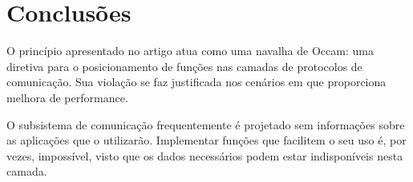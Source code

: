 \section*{Conclusões}

O princípio apresentado no artigo atua como uma navalha de Occam: uma diretiva para o posicionamento de funções nas camadas de protocolos de comunicação. Sua violação se faz justificada nos cenários em que proporciona melhora de performance.

O subsistema de comunicação frequentemente é projetado sem informações sobre as aplicações que o utilizarão. Implementar funções que facilitem o seu uso é, por vezes, impossível, visto que os dados necessários podem estar indisponíveis nesta camada.
